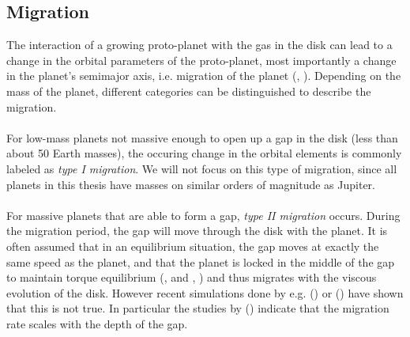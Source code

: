     \subsection{Migration}
      The interaction of a growing proto-planet with the gas in the disk 
      can lead to a change in the orbital parameters of the proto-planet, 
      most importantly a change in the planet's semimajor axis, i.e. 
      migration of the planet (\citeauthor{Kley_2015}, \citeyear{Kley_2015}).
      Depending on the mass of the planet, different categories can be 
      distinguished to describe the migration. \\
      \\
      For low-mass planets not massive enough to open up a gap in the disk 
      (less than about 50 Earth masses), the occuring change in the 
      orbital elements is commonly labeled as \textit{type I migration}.
      We will not focus on this type of migration,
      since all planets in this thesis have masses on similar orders of 
      magnitude as Jupiter. \\
      \\
      For massive planets that are able to form a gap, 
      \textit{type II migration} occurs. 
      During the migration period, the gap will move through the disk with the 
      planet. It is often assumed that in an equilibrium situation, the gap 
      moves at exactly the same speed as the planet, and that the planet is 
      locked in the middle of the gap to maintain torque equilibrium 
      (\citeauthor{Kley_2015}, \citeyear{Kley_2015} and 
      \citeauthor{Papaloizou_1986}, \citeyear{Papaloizou_1986}) and thus 
      migrates with the 
      viscous evolution of the disk. However recent simulations done by
      e.g. \citeauthor{Kley_2015} (\citeyear{Kley_2015}) or 
      \citeauthor{Robert_2018} (\citeyear{Robert_2018})
      have shown that this is not true. In particular the studies by
      \citeauthor{Kanagawa_2018} (\citeyear{Kanagawa_2018}) 
      indicate that the migration rate scales with the depth of the gap.


